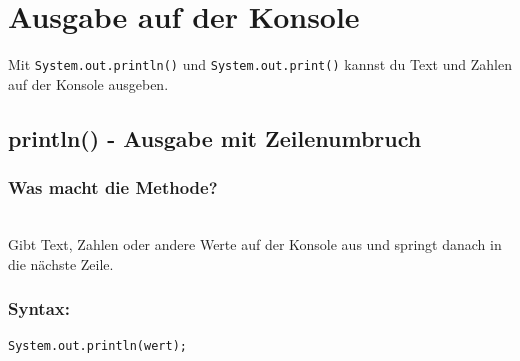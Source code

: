 \newpage


\section*{Ausgabe auf der Konsole}

Mit \texttt{System.out.println()} und \texttt{System.out.print()} kannst du Text und Zahlen auf der Konsole ausgeben.


\subsection*{println() - Ausgabe mit Zeilenumbruch}

\subsubsection*{Was macht die Methode?}\\
Gibt Text, Zahlen oder andere Werte auf der Konsole aus und springt danach in die nächste Zeile.

\subsubsection*{Syntax:}
\begin{lstlisting}
System.out.println(wert);
\end{lstlisting}

